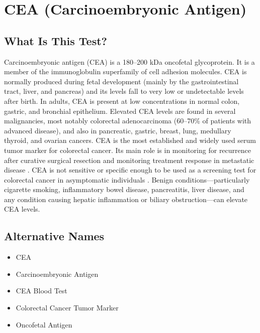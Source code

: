 \chapter{CEA (Carcinoembryonic Antigen)}

\section*{What Is This Test?}
Carcinoembryonic antigen (CEA) is a 180--200 kDa oncofetal glycoprotein. It is a member of the immunoglobulin superfamily of cell adhesion molecules. CEA is normally produced during fetal development (mainly by the gastrointestinal tract, liver, and pancreas) and its levels fall to very low or undetectable levels after birth. In adults, CEA is present at low concentrations in normal colon, gastric, and bronchial epithelium. Elevated CEA levels are found in several malignancies, most notably colorectal adenocarcinoma (60--70\% of patients with advanced disease), and also in pancreatic, gastric, breast, lung, medullary thyroid, and ovarian cancers. CEA is the most established and widely used serum tumor marker for colorectal cancer. Its main role is in monitoring for recurrence after curative surgical resection and monitoring treatment response in metastatic disease \cite{duffy2007tumour}. CEA is not sensitive or specific enough to be used as a screening test for colorectal cancer in asymptomatic individuals \cite{fletcher1986carcinoembryonic}. Benign conditions---particularly cigarette smoking, inflammatory bowel disease, pancreatitis, liver disease, and any condition causing hepatic inflammation or biliary obstruction---can elevate CEA levels.

\section*{Alternative Names}
\begin{itemize}
  \item CEA
  \item Carcinoembryonic Antigen
  \item CEA Blood Test
  \item Colorectal Cancer Tumor Marker
  \item Oncofetal Antigen
\end{itemize}
